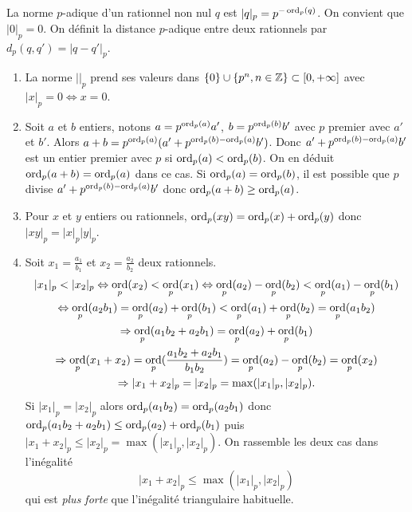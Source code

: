  
\begin{defi}
 La norme $p$-adique d'un rationnel non nul $q$ est $| q |_p = p^{-\mathop{\mathrm{ord}}_p(q)}$.\newline
 On convient que $| 0 |_p = 0$.
 On définit la distance $p$-adique entre deux rationnels par $d_p(q,q') = |q - q'|_p$.
\end{defi}
\begin{rems}
\begin{enumerate}
  \item La norme $||_p$ prend ses valeurs dans $\{0\} \cup \{p^n, n \in \mathbb{Z}\} \subset [0,+\infty]$ avec $|x|_p = 0 \Leftrightarrow x=0$.
  \item Soit $a$ et $b$ entiers, notons $a = p^{\mathop{\mathrm{ord}}_p(a)}a'$, $b = p^{\mathop{\mathrm{ord}}_p(b)}b'$ avec $p$ premier avec $a'$ et $b'$.\newline
 Alors $a+b= p^{\mathop{\mathrm{ord}}_p(a)}(a' + p^{\mathop{\mathrm{ord}}_p(b)-\mathop{\mathrm{ord}}_p(a)}b')$. Donc $a' + p^{\mathop{\mathrm{ord}}_p(b)-\mathop{\mathrm{ord}}_p(a)}b'$ est un entier premier avec $p$ si $\mathop{\mathrm{ord}}_p(a) < \mathop{\mathrm{ord}}_p(b)$. On en déduit $\mathop{\mathrm{ord}}_p(a + b) = \mathop{\mathrm{ord}}_p(a)$ dans ce cas.\newline
 Si $\mathop{\mathrm{ord}}_p(a)=\mathop{\mathrm{ord}}_p(b)$, il est possible que $p$ divise $a' + p^{\mathop{\mathrm{ord}}_p(b)-\mathop{\mathrm{ord}}_p(a)}b'$ donc $\mathop{\mathrm{ord}}_p(a+b)\geq \mathop{\mathrm{ord}}_p(a)$.
  \item  Pour $x$ et $y$ entiers ou rationnels, $\mathop{\mathrm{ord}}_p(x y) = \mathop{\mathrm{ord}}_p(x) + \mathop{\mathrm{ord}}_p(y)$ donc $|x y|_p = |x|_p |y|_p$.
  \item  Soit $x_1 = \frac{a_1}{b_1}$ et $x_2 = \frac{a_2}{b_2}$ deux rationnels.
\begin{multline*}
 |x_1|_p < |x_2|_p \Leftrightarrow \mathop{\mathrm{ord}}_p(x_2) < \mathop{\mathrm{ord}}_p(x_1)\Leftrightarrow \mathop{\mathrm{ord}}_p(a_2) - \mathop{\mathrm{ord}}_p(b_2) < \mathop{\mathrm{ord}}_p(a_1) - \mathop{\mathrm{ord}}_p(b_1) \\
 \Leftrightarrow \mathop{\mathrm{ord}}_p(a_2b_1) = \mathop{\mathrm{ord}}_p(a_2) + \mathop{\mathrm{ord}}_p(b_1) < \mathop{\mathrm{ord}}_p(a_1) + \mathop{\mathrm{ord}}_p(b_2) = \mathop{\mathrm{ord}}_p(a_1b_2)\\
 \Rightarrow \mathop{\mathrm{ord}}_p(a_1b_2 + a_2b_1) = \mathop{\mathrm{ord}}_p(a_2) + \mathop{\mathrm{ord}}_p(b_1) \\
 \Rightarrow \mathop{\mathrm{ord}}_p(x_1 + x_2) = \mathop{\mathrm{ord}}_p(\frac{a_1b_2 + a_2b_1}{b_1 b_2}) = \mathop{\mathrm{ord}}_p(a_2) - \mathop{\mathrm{ord}}_p(b_2) = \mathop{\mathrm{ord}}_p(x_2) \\
 \Rightarrow |x_1 + x_2|_p = |x_2|_p = \max(|x_1|_p, |x_2|_p).
\end{multline*}
Si $|x_1|_p = |x_2|_p$ alors $\mathop{\mathrm{ord}}_p(a_1b_2) = \mathop{\mathrm{ord}}_p(a_2b_1)$ donc $\mathop{\mathrm{ord}}_p(a_1b_2 + a_2b_1) \leq \mathop{\mathrm{ord}}_p(a_2) + \mathop{\mathrm{ord}}_p(b_1)$ puis $|x_1 + x_2|_p \leq |x_2|_p = \max(|x_1|_p, |x_2|_p)$.\newline
On rassemble les deux cas dans l'inégalité
\begin{displaymath}
  |x_1 + x_2|_p  \leq \max(|x_1|_p, |x_2|_p)
\end{displaymath}
qui est \emph{plus forte} que l'inégalité triangulaire habituelle.
\end{enumerate}
\end{rems}
